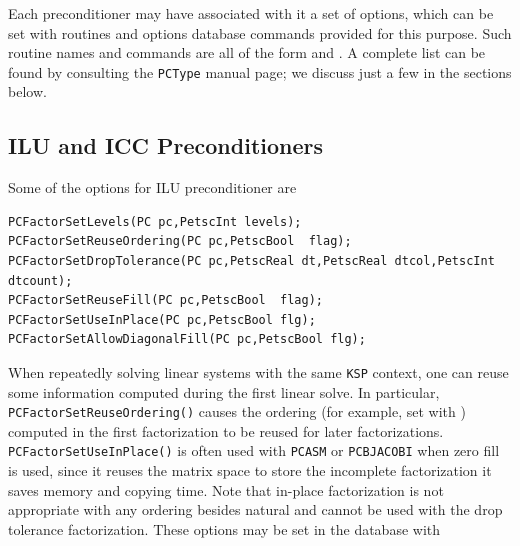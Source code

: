 Each preconditioner may have associated with it a set of options,
which can be set with routines and options database commands provided
for this purpose.  Such routine names and commands are all of the form
 and .  
A complete list can be found by consulting the \lstinline{PCType} manual page; we discuss
just a few in the sections below.

\subsection{ILU and ICC Preconditioners}
\label{sec_ilu_icc}

Some of the options for ILU preconditioner are
\begin{lstlisting}
PCFactorSetLevels(PC pc,PetscInt levels);
PCFactorSetReuseOrdering(PC pc,PetscBool  flag);
PCFactorSetDropTolerance(PC pc,PetscReal dt,PetscReal dtcol,PetscInt dtcount);
PCFactorSetReuseFill(PC pc,PetscBool  flag);
PCFactorSetUseInPlace(PC pc,PetscBool flg); 
PCFactorSetAllowDiagonalFill(PC pc,PetscBool flg);
\end{lstlisting}

When repeatedly solving linear systems with the same \lstinline{KSP}
context, one can reuse some information  computed
during the first linear solve.
In particular, \lstinline{PCFactorSetReuseOrdering()} causes the ordering  (for example, set with
 ) computed in the first factorization to be reused
for later factorizations. 
\lstinline{PCFactorSetUseInPlace()} is often used with
\lstinline{PCASM} or \lstinline{PCBJACOBI} when zero fill is used, since it reuses the
matrix space to store the incomplete factorization it saves memory and
copying time. Note that in-place factorization is not appropriate with
any ordering besides natural and cannot be used with the drop tolerance
factorization. These options may be set in the database with
\begin{tightitemize}
\item {}
\item {}
\item {}
\item {}
\item {}
\item {}
\end{tightitemize}
 
 

